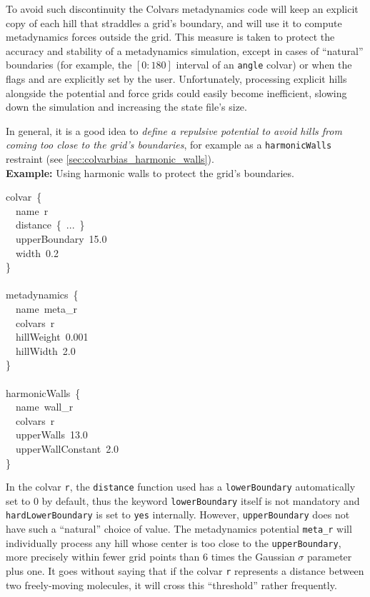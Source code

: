 To avoid such discontinuity the Colvars metadynamics code will keep an explicit copy of each hill that straddles a grid's boundary, and will use it to compute metadynamics forces outside the grid.
This measure is taken to protect the accuracy and stability of a metadynamics simulation, except in cases of ``natural'' boundaries (for example, the $[0:180]$ interval of an \texttt{angle} colvar) or when the flags  and  are explicitly set by the user.
Unfortunately, processing explicit hills alongside the potential and force grids could easily become inefficient, slowing down the simulation and increasing the state file's size.

In general, it is a good idea to \emph{define a repulsive potential to avoid hills from coming too close to the grid's boundaries}, for example as a \texttt{harmonicWalls} restraint (see \ref{sec:colvarbias_harmonic_walls}).\\

\noindent\textbf{Example:} Using harmonic walls to protect the grid's boundaries.
\begin{cvexampleinput}
\-colvar~\{\\
\-\-~~name~r\\
\-\-~~distance~\{~...~\}\\
\-\-~~upperBoundary~15.0\\
\-\-~~width~0.2\\
\-\}\\
\\
\-metadynamics~\{\\
\-\-~~name~meta\_r\\
\-\-~~colvars~r\\
\-\-~~hillWeight~0.001\\
\-\-~~hillWidth~2.0\\
\-\}\\
\\
\-harmonicWalls~\{\\
\-\-~~name~wall\_r\\
\-\-~~colvars~r\\
\-\-~~upperWalls~13.0\\
\-\-~~upperWallConstant~2.0\\
\-\}
\end{cvexampleinput}

In the colvar \texttt{r}, the \texttt{distance} function used has a \texttt{lowerBoundary} automatically set to 0 by default, thus the keyword \texttt{lowerBoundary} itself is not mandatory and \texttt{hardLowerBoundary} is set to \texttt{yes} internally.
However, \texttt{upperBoundary} does not have such a ``natural'' choice of value.
The metadynamics potential \texttt{meta\_r} will individually process any hill whose center is too close to the \texttt{upperBoundary}, more precisely within fewer grid points than 6 times the Gaussian $\sigma$ parameter plus one.
It goes without saying that if the colvar \texttt{r} represents a distance between two freely-moving molecules, it will cross this ``threshold'' rather frequently.

